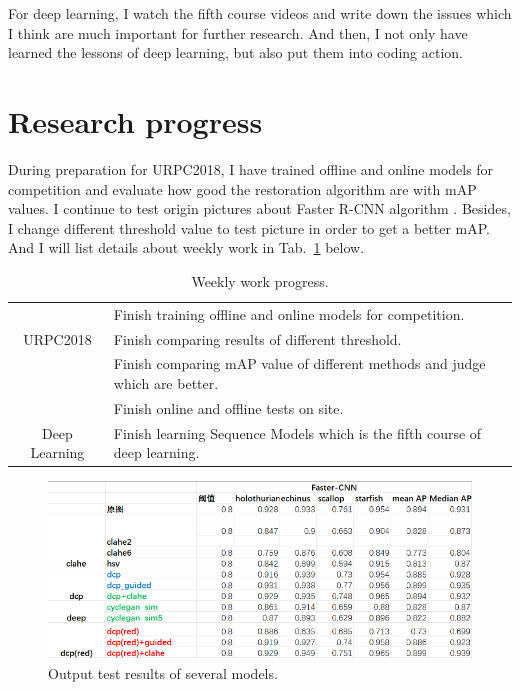 \documentclass[a4paper]{article}
\begin{document}
	For deep learning, I watch the fifth course videos and write down the issues which I think are much important for further research. And then, I not only have learned the lessons of deep learning, but also put them into coding action. 
	
	
	\section{Research progress}
	
	During preparation for URPC2018, I have trained offline and online models for competition and evaluate how good the restoration algorithm are with mAP values. I continue to test origin pictures about Faster R-CNN algorithm \cite{Ren2015Faster}. Besides, I change different threshold value to test picture in order to get a better mAP. And I will list details about weekly work in Tab.~\ref{t1} below.

	
	\begin{table}[hb]
		\centering
		\caption{Weekly work progress.}
		\begin{tabular}{c|p{10cm}}
			\hline 
			& Finish training offline and online models for competition.\\
			
			URPC2018& Finish comparing results of different threshold. \\
			
			& Finish comparing mAP value of different methods and judge which are better.\\
			
			& Finish online and offline tests on site.\\

			\hline
			Deep Learning& Finish learning Sequence Models which is the fifth course of deep learning.\\
			\hline
		\end{tabular}
		\label{t1}
	\end{table} 
	
		
		\begin{figure}
			\begin{center}
				\includegraphics[scale=0.6]{figures/1.png}
			\end{center}
			\caption{Output test results of several models.}
			\label{p1}
		\end{figure}
	
\end{document}
